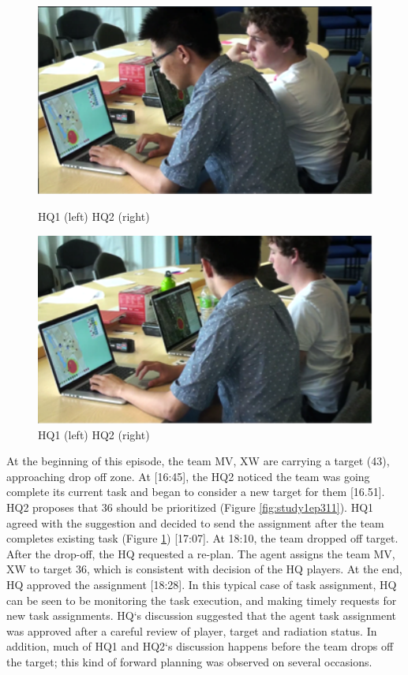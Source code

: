 \begin{figure}[ht]
\centering
\begin{minipage}[b]{0.45\linewidth}
\includegraphics[width=1\textwidth]{img/study3/ep11}
\caption{HQ1 (left) HQ2 (right) }
\label{fig:study1ep311}
\end{minipage}
\quad
\begin{minipage}[b]{0.45\linewidth}
 \includegraphics[width=1\textwidth]{img/study3/ep12}
\caption{HQ1 (left) HQ2 (right)}
\label{fig:study1ep312}
\end{minipage}
\end{figure}

At the beginning of this episode, the team MV, XW are carrying a target (43), approaching drop off zone. At [16:45], the HQ2 noticed the team was going complete its current task and began to consider a new target for them [16.51]. HQ2 proposes that 36 should be prioritized (Figure \ref{fig:study1ep311}). HQ1 agreed with the suggestion and decided to send the assignment after the team completes existing task (Figure \ref{fig:study1ep312}) [17:07]. At 18:10, the team dropped off target. After the drop-off, the HQ requested a re-plan. The agent assigns the team MV, XW to target 36, which is consistent with decision of the HQ players. At the end, HQ approved the assignment [18:28]. In this typical case of task assignment, HQ  can be seen to be monitoring the task execution, and making timely requests for new task assignments. HQ`s discussion suggested that the agent task assignment was approved after a careful review of player, target and radiation status. In addition, much of HQ1 and HQ2`s discussion happens before the team drops off the target; this kind of forward planning was observed on several occasions.\\

